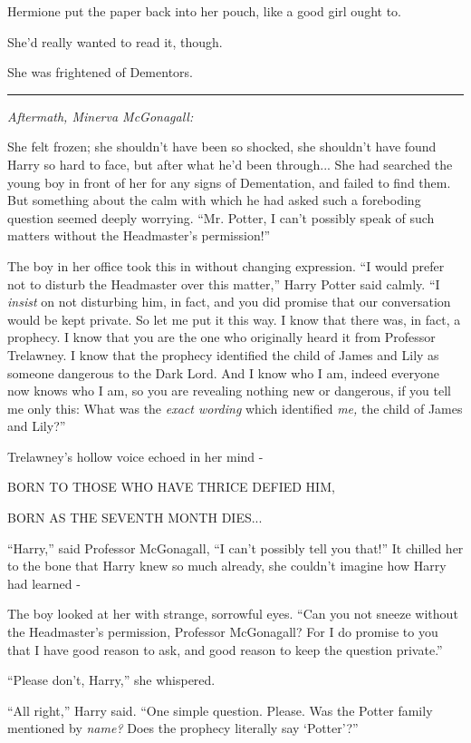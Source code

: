 Hermione put the paper back into her pouch, like a good girl ought to.

She'd really wanted to read it, though.

She was frightened of Dementors.

\begin{center}\rule{3in}{0.4pt}\end{center}

\emph{Aftermath, Minerva McGonagall:}

She felt frozen; she shouldn't have been so shocked, she shouldn't have found Harry so hard to face, but after what he'd been through... She had searched the young boy in front of her for any signs of Dementation, and failed to find them. But something about the calm with which he had asked such a foreboding question seemed deeply worrying. ``Mr. Potter, I can't possibly speak of such matters without the Headmaster's permission!''

The boy in her office took this in without changing expression. ``I would prefer not to disturb the Headmaster over this matter,'' Harry Potter said calmly. ``I \emph{insist} on not disturbing him, in fact, and you did promise that our conversation would be kept private. So let me put it this way. I know that there was, in fact, a prophecy. I know that you are the one who originally heard it from Professor Trelawney. I know that the prophecy identified the child of James and Lily as someone dangerous to the Dark Lord. And I know who I am, indeed everyone now knows who I am, so you are revealing nothing new or dangerous, if you tell me only this: What was the \emph{exact wording} which identified \emph{me,} the child of James and Lily?''

Trelawney's hollow voice echoed in her mind -

BORN TO THOSE WHO HAVE THRICE DEFIED HIM,

BORN AS THE SEVENTH MONTH DIES...

``Harry,'' said Professor McGonagall, ``I can't possibly tell you that!'' It chilled her to the bone that Harry knew so much already, she couldn't imagine how Harry had learned -

The boy looked at her with strange, sorrowful eyes. ``Can you not sneeze without the Headmaster's permission, Professor McGonagall? For I do promise to you that I have good reason to ask, and good reason to keep the question private.''

``Please don't, Harry,'' she whispered.

``All right,'' Harry said. ``One simple question. Please. Was the Potter family mentioned by \emph{name?} Does the prophecy literally say `Potter'?''

